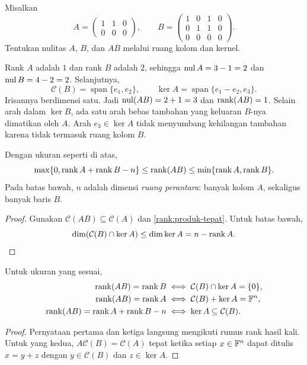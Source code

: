 \begin{exam}
    Misalkan
    \[
        A=\begin{pmatrix}1&1&0\\0&0&0\end{pmatrix},\qquad
        B=\begin{pmatrix}1&0&1&0\\0&1&1&0\\0&0&0&0\end{pmatrix}.
    \]
    Tentukan nulitas $A$, $B$, dan $AB$ melalui ruang kolom dan kernel.
\end{exam}
\begin{solution}
    Rank $A$ adalah $1$ dan rank $B$ adalah $2$, sehingga
    $\operatorname{nul} A=3-1=2$ dan $\operatorname{nul} B=4-2=2$.
    Selanjutnya,
    \[
        \mathcal C(B)=\operatorname{span}\{e_1,e_2\},\qquad
        \ker A=\operatorname{span}\{e_1-e_2,e_3\}.
    \]
    Irisannya berdimensi satu. Jadi $\operatorname{nul}(AB)=2+1=3$ dan $\operatorname{rank}(AB)=1$.
    Selain arah dalam $\ker B$, ada satu arah bebas tambahan yang
    keluaran $B$-nya dimatikan oleh $A$.
    Arah $e_3\in\ker A$ tidak menyumbang kehilangan tambahan karena
    tidak termasuk ruang kolom $B$.
\end{solution}


\begin{teorema}
    Dengan ukuran seperti di atas,
    \[
        \max\{0,\operatorname{rank} A+\operatorname{rank} B-n\}
        \le\operatorname{rank}(AB)\le\min\{\operatorname{rank} A,\operatorname{rank} B\}.
    \]
    Pada batas bawah, $n$ adalah dimensi \emph{ruang perantara}:
    banyak kolom $A$, sekaligus banyak baris $B$.
\end{teorema}
\begin{proof}
    Gunakan $\mathcal C(AB)\subseteq\mathcal C(A)$ dan
    \autoref{rank:produk-tepat}. Untuk batas bawah,
    \[
        \dim(\mathcal C(B)\cap\ker A)\le\dim\ker A=n-\operatorname{rank} A.
    \]
\end{proof}

\begin{prop}
    \label{rank:kesamaan-produk}
    Untuk ukuran yang sesuai,
    \begin{align*}
        \operatorname{rank}(AB)=\operatorname{rank} B
        &\iff \mathcal C(B)\cap\ker A=\{0\},\\
        \operatorname{rank}(AB)=\operatorname{rank} A
        &\iff \mathcal C(B)+\ker A=\mathbb{F}^n,\\
        \operatorname{rank}(AB)=\operatorname{rank} A+\operatorname{rank} B-n
        &\iff \ker A\subseteq\mathcal C(B).
    \end{align*}
\end{prop}
\begin{proof}
    Pernyataan pertama dan ketiga langsung mengikuti rumus rank hasil
    kali. Untuk yang kedua, $A\mathcal C(B)=\mathcal C(A)$ tepat ketika
    setiap $x\in\mathbb{F}^n$ dapat ditulis $x=y+z$ dengan
    $y\in\mathcal C(B)$ dan $z\in\ker A$.
\end{proof}

